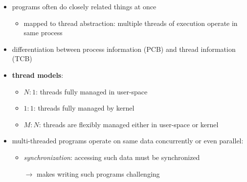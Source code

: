 \begin{summary}
  \begin{itemize}
    \item programs often do closely related things at once
    \begin{itemize}
      \item mapped to thread abstraction: multiple threads of execution operate in same process
    \end{itemize}
    \item differentiation between process information (PCB) and thread information (TCB)
    \item \textbf{thread models}:
    \begin{itemize}
      \item $ N:1 $: threads fully managed in user-space
      \item $ 1:1 $: threads fully managed by kernel
      \item $ M:N $: threads are flexibly managed either in user-space or kernel
    \end{itemize}
    \item multi-threaded programs operate on same data concurrently or even parallel:
    \begin{itemize}
      \item \emph{synchronization}: accessing such data must be synchronized
      \item[$ \to $] makes writing such programs challenging
    \end{itemize}
  \end{itemize}
\end{summary}
